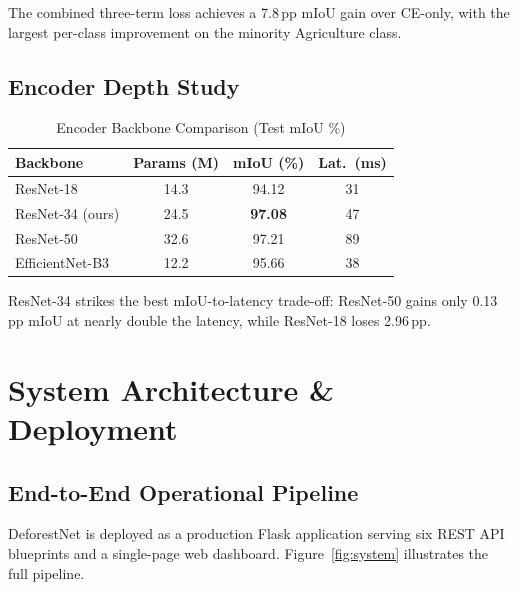 \documentclass[10pt,conference]{IEEEtran}
\begin{document}
The combined three-term loss achieves a 7.8\,pp mIoU gain over CE-only,
with the largest per-class improvement on the minority Agriculture class.

\subsection{Encoder Depth Study}

\begin{table}[!t]
  \caption{Encoder Backbone Comparison (Test mIoU \%)}
  \label{tab:backbone_ablation}
  \centering
  \small
  \begin{tabular}{l c c c}
    \toprule
    \textbf{Backbone} & \textbf{Params (M)} & \textbf{mIoU (\%)} & \textbf{Lat.\ (ms)} \\
    \midrule
    ResNet-18         & 14.3 & 94.12 & 31 \\
    ResNet-34 (ours)  & 24.5 & \textbf{97.08} & 47 \\
    ResNet-50         & 32.6 & 97.21 & 89 \\
    EfficientNet-B3   & 12.2 & 95.66 & 38 \\
    \bottomrule
  \end{tabular}
\end{table}

ResNet-34 strikes the best mIoU-to-latency trade-off: ResNet-50 gains only
0.13\,pp mIoU at nearly double the latency, while ResNet-18 loses 2.96\,pp.

\section{System Architecture \& Deployment}
\label{sec:system}

\subsection{End-to-End Operational Pipeline}

DeforestNet is deployed as a production Flask application serving six REST API
blueprints and a single-page web dashboard. Figure~\ref{fig:system} illustrates
the full pipeline.
\end{document}
